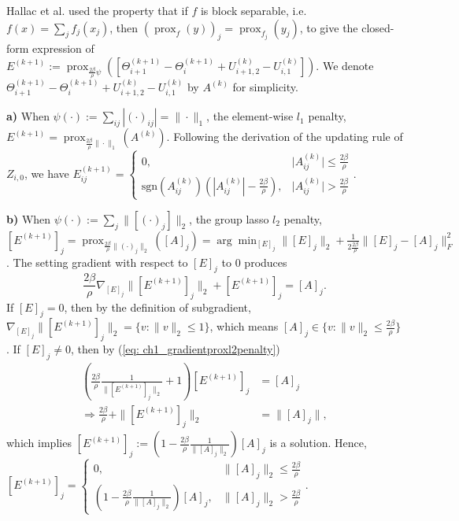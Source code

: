 Hallac et al. used the property that if $f$ is block separable, i.e.$f(x)=\sum_{j}f_j(x_j)$, then $(\operatorname{prox}_f(y))_j=\operatorname{prox}_{f_j}(y_j)$, 
to give the closed-form expression of $E^{(k+1)}:=\operatorname{prox}_{\frac{2\beta}{\rho}\psi}([\Theta_{i+1}^{(k+1)}-\Theta_i^{(k+1)}+U_{i+1,2}^{(k)}-U_{i,1}^{(k)}])$. 
We denote $\Theta_{i+1}^{(k+1)}-\Theta_i^{(k+1)}+U_{i+1,2}^{(k)}-U_{i,1}^{(k)}$ by $A^{(k)}$ for simplicity.

\textbf{a)} When $\psi(\cdot):=\sum_{ij}|(\cdot)_{ij}|=\|\cdot\|_1$, the element-wise $l_1$ penalty, 
$E^{(k+1)}=\operatorname{prox}_{\frac{2\beta}{\rho}\|\cdot\|_1}(A^{(k)})$.
Following the derivation of the updating rule of $Z_{i,0}$, we have
$E^{(k+1)}_{ij}=\left\{\begin{aligned}
    0, &\bigg|A^{(k)}_{ij}\bigg|\leq\frac{2\beta}{\rho} \\
    \text{sgn}(A^{(k)}_{ij})(|A^{(k)}_{ij}|-\frac{2\beta}{\rho}), &\bigg|A^{(k)}_{ij}\bigg|>\frac{2\beta}{\rho}
\end{aligned}\right.$.

\textbf{b)} When $\psi(\cdot):=\sum_{j}\|[(\cdot)_j]\|_2$, the group lasso $l_2$ penalty,
$[E^{(k+1)}]_j=\operatorname{prox}_{\frac{2\beta}{\rho}\|(\cdot)_j\|_2}([A]_j)=\arg\min_{[E]_j}\|[E]_j\|_2+\frac{1}{2\frac{2\beta}{\rho}}\|[E]_j-[A]_j\|_F^2$. 
The setting gradient with respect to $[E]_j$ to 0 produces 
\begin{equation}
    \label{eq: ch1_gradientproxl2penalty}
    \frac{2\beta}{\rho}\nabla_{[E]_j}\|[E^{(k+1)}]_j\|_2+[E^{(k+1)}]_j=[A]_j. 
\end{equation}
If $[E]_j=0$, then by the definition of subgradient, $\nabla_{[E]_j}\|[E^{(k+1)}]_j\|_2=\{v:\|v\|_2\leq 1\}$, 
which means $[A]_j\in\{v:\|v\|_2\leq \frac{2\beta}{\rho}\}$.
If $[E]_j\neq 0$, then by (\ref{eq: ch1_gradientproxl2penalty})
\begin{align*}
    (\frac{2\beta}{\rho}\frac{1}{\|[E^{(k+1)}]_j\|_2}+1)[E^{(k+1)}]_j&=[A]_j \\
    \Longrightarrow\frac{2\beta}{\rho}+\|[E^{(k+1)}]_j\|_2&=\|[A]_j\|,
\end{align*}
which implies $[E^{(k+1)}]_j:=(1-\frac{2\beta}{\rho}\frac{1}{\|[A]_j\|_2})[A]_j$ is a solution.
Hence, $[E^{(k+1)}]_j=\left\{\begin{aligned}
    0, & \|[A]_j\|_2\leq\frac{2\beta}{\rho} \\
    (1-\frac{2\beta}{\rho}\frac{1}{\|[A]_j\|_2})[A]_j, &\|[A]_j\|_2>\frac{2\beta}{\rho}
\end{aligned}\right.$.

